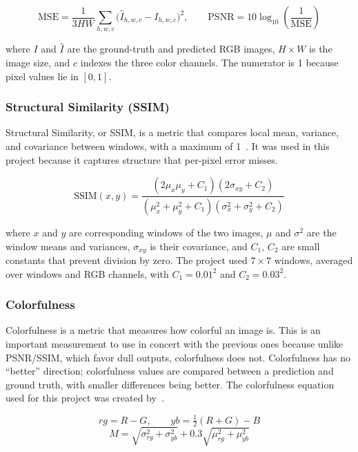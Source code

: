 \documentclass{article}
\begin{document}
\begin{equation}
\mathrm{MSE} = \frac{1}{3HW} \sum_{h,w,c} \big(\hat{I}_{h,w,c} - I_{h,w,c}\big)^2,
\qquad
\mathrm{PSNR} = 10 \log_{10}\!\left(\frac{1}{\mathrm{MSE}}\right)
\label{eq:psnr}
\end{equation}

where $I$ and $\hat{I}$ are the ground-truth and predicted RGB images, $H \times W$ is the image size, and $c$ indexes the three color channels. The numerator is 1 because pixel values lie in $[0, 1]$.

\subsubsection{Structural Similarity (SSIM)}
Structural Similarity, or SSIM, is a metric that compares local mean, variance, and covariance between windows, with a maximum of 1~\citep{wang2004ssim}. It was used in this project because it captures structure that per-pixel error misses.

\begin{equation}
\mathrm{SSIM}(x, y) = \frac{(2\mu_x \mu_y + C_1)(2\sigma_{xy} + C_2)}
                           {(\mu_x^2 + \mu_y^2 + C_1)(\sigma_x^2 + \sigma_y^2 + C_2)}
\label{eq:ssim}
\end{equation}

where $x$ and $y$ are corresponding windows of the two images, $\mu$ and $\sigma^2$ are the window means and variances, $\sigma_{xy}$ is their covariance, and $C_1$, $C_2$ are small constants that prevent division by zero. The project used $7 \times 7$ windows, averaged over windows and RGB channels, with $C_1 = 0.01^2$ and $C_2 = 0.03^2$.

\subsubsection{Colorfulness}
Colorfulness is a metric that measures how colorful an image is. This is an important measurement to use in concert with the previous ones because unlike PSNR/SSIM, which favor dull outputs, colorfulness does not. Colorfulness has no ``better'' direction; colorfulness values are compared between a prediction and ground truth, with smaller differences being better. The colorfulness equation used for this project was created by~\citet{hasler2003colorfulness}.

\begin{equation}
rg = R - G, \qquad yb = \tfrac{1}{2}(R + G) - B
\end{equation}
\begin{equation}
M = \sqrt{\sigma_{rg}^2 + \sigma_{yb}^2} + 0.3\sqrt{\mu_{rg}^2 + \mu_{yb}^2}
\label{eq:colorfulness}
\end{equation}
\end{document}
